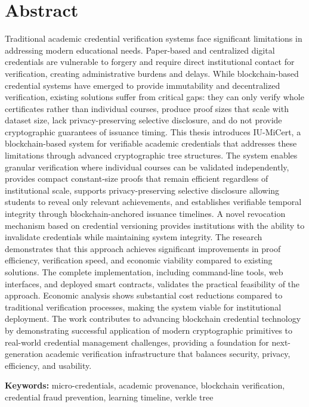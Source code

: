 \chapter*{Abstract}

Traditional academic credential verification systems face significant limitations in addressing modern educational needs. Paper-based and centralized digital credentials are vulnerable to forgery and require direct institutional contact for verification, creating administrative burdens and delays. While blockchain-based credential systems have emerged to provide immutability and decentralized verification, existing solutions suffer from critical gaps: they can only verify whole certificates rather than individual courses, produce proof sizes that scale with dataset size, lack privacy-preserving selective disclosure, and do not provide cryptographic guarantees of issuance timing. This thesis introduces IU-MiCert, a blockchain-based system for verifiable academic credentials that addresses these limitations through advanced cryptographic tree structures. The system enables granular verification where individual courses can be validated independently, provides compact constant-size proofs that remain efficient regardless of institutional scale, supports privacy-preserving selective disclosure allowing students to reveal only relevant achievements, and establishes verifiable temporal integrity through blockchain-anchored issuance timelines. A novel revocation mechanism based on credential versioning provides institutions with the ability to invalidate credentials while maintaining system integrity. The research demonstrates that this approach achieves significant improvements in proof efficiency, verification speed, and economic viability compared to existing solutions. The complete implementation, including command-line tools, web interfaces, and deployed smart contracts, validates the practical feasibility of the approach. Economic analysis shows substantial cost reductions compared to traditional verification processes, making the system viable for institutional deployment. The work contributes to advancing blockchain credential technology by demonstrating successful application of modern cryptographic primitives to real-world credential management challenges, providing a foundation for next-generation academic verification infrastructure that balances security, privacy, efficiency, and usability.

\vspace{0.5cm}

\noindent\textbf{Keywords:} micro-credentials, academic provenance, blockchain verification, credential fraud prevention, learning timeline, verkle tree
